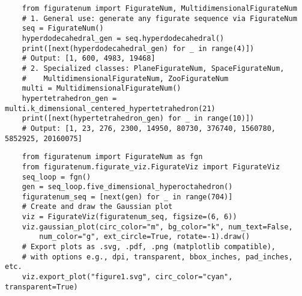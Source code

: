 \documentclass{article}
\begin{document}
\begin{multicols}{2}
    \begin{tcolorbox}[title= Import and generate sequences with FigurateNum and related classes]
        \begin{lstlisting}
    from figuratenum import FigurateNum, MultidimensionalFigurateNum
    # 1. General use: generate any figurate sequence via FigurateNum
    seq = FigurateNum()
    hyperdodecahedral_gen = seq.hyperdodecahedral()
    print([next(hyperdodecahedral_gen) for _ in range(4)])
    # Output: [1, 600, 4983, 19468]
    # 2. Specialized classes: PlaneFigurateNum, SpaceFigurateNum,
    #    MultidimensionalFigurateNum, ZooFigurateNum
    multi = MultidimensionalFigurateNum()
    hypertetrahedron_gen = multi.k_dimensional_centered_hypertetrahedron(21)
    print([next(hypertetrahedron_gen) for _ in range(10)])
    # Output: [1, 23, 276, 2300, 14950, 80730, 376740, 1560780, 5852925, 20160075]
        \end{lstlisting}
    \end{tcolorbox}

    \begin{tcolorbox}[title = Using FigurateViz to visualize and export]
        \begin{lstlisting}
    from figuratenum import FigurateNum as fgn
    from figuratenum.figurate_viz.FigurateViz import FigurateViz
    seq_loop = fgn()
    gen = seq_loop.five_dimensional_hyperoctahedron()
    figuratenum_seq = [next(gen) for _ in range(704)]
    # Create and draw the Gaussian plot
    viz = FigurateViz(figuratenum_seq, figsize=(6, 6))
    viz.gaussian_plot(circ_color="m", bg_color="k", num_text=False,
        num_color="g", ext_circle=True, rotate=-1).draw()
    # Export plots as .svg, .pdf, .png (matplotlib compatible),
    # with options e.g., dpi, transparent, bbox_inches, pad_inches, etc.
    viz.export_plot("figure1.svg", circ_color="cyan", transparent=True)
        \end{lstlisting}
    \end{tcolorbox}

\end{multicols}
\end{document}
